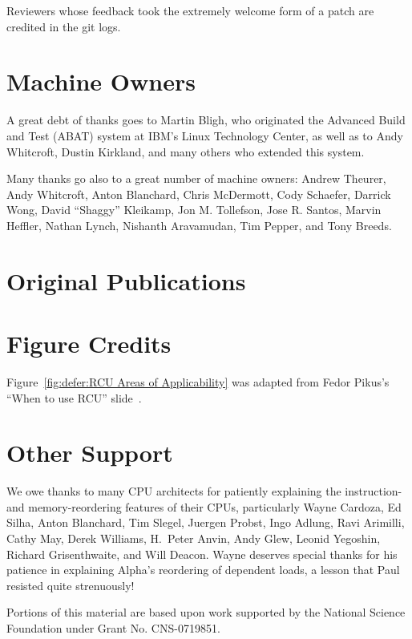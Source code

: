 Reviewers whose feedback took the extremely welcome form of a patch
are credited in the git logs.

\section{Machine Owners}

A great debt of thanks goes to Martin Bligh, who originated the
Advanced Build and Test (ABAT) system at IBM's Linux Technology
Center, as well as to Andy Whitcroft, Dustin Kirkland, and many
others who extended this system.

Many thanks go also to a great number of machine owners:
Andrew Theurer,
Andy Whitcroft,
Anton Blanchard,
Chris McDermott,
Cody Schaefer,
Darrick Wong,
David ``Shaggy'' Kleikamp,
Jon M. Tollefson,
Jose R. Santos,
Marvin Heffler,
Nathan Lynch,
Nishanth Aravamudan,
Tim Pepper,
and
Tony Breeds.

\section{Original Publications}

\ListOriginalPublications

\section{Figure Credits}

\ListContributions

Figure~\ref{fig:defer:RCU Areas of Applicability} was adapted from
Fedor Pikus's ``When to use RCU'' slide~\cite{FedorPikus2017RCUthenWhat}.

\section{Other Support}

We owe thanks to many CPU architects for patiently explaining the
instruction- and memory-reordering features of their CPUs, particularly
Wayne Cardoza, Ed Silha, Anton Blanchard, Tim Slegel, Juergen Probst,
Ingo Adlung, Ravi Arimilli, Cathy May, Derek Williams,
H.~Peter Anvin,
Andy Glew, Leonid Yegoshin,
Richard Grisenthwaite, and Will Deacon.
Wayne deserves special thanks for his patience in explaining Alpha's reordering
of dependent loads, a lesson that Paul resisted quite strenuously!

Portions of this material are based upon work supported by the National
Science Foundation under Grant No. CNS-0719851.
